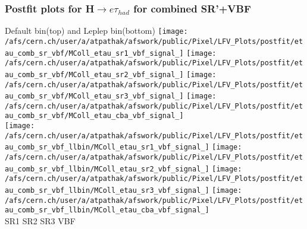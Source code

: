 \documentclass{beamer}
\begin{document}
\begin{frame}
\frametitle{Postfit plots for H$\rightarrow e\tau_{had}$ for combined SR'+VBF}
\begin{normalsize}
Default bin(top) and Leplep bin(bottom)
\vspace*{0.5cm}
\texttt{[image: /afs/cern.ch/user/a/atpathak/afswork/public/Pixel/LFV\_Plots/postfit/etau\_comb\_sr\_vbf/MColl\_etau\_sr1\_vbf\_signal\_]}
\texttt{[image: /afs/cern.ch/user/a/atpathak/afswork/public/Pixel/LFV\_Plots/postfit/etau\_comb\_sr\_vbf/MColl\_etau\_sr2\_vbf\_signal\_]}
\texttt{[image: /afs/cern.ch/user/a/atpathak/afswork/public/Pixel/LFV\_Plots/postfit/etau\_comb\_sr\_vbf/MColl\_etau\_sr3\_vbf\_signal\_]}
\texttt{[image: /afs/cern.ch/user/a/atpathak/afswork/public/Pixel/LFV\_Plots/postfit/etau\_comb\_sr\_vbf/MColl\_etau\_cba\_vbf\_signal\_]}\\

\texttt{[image: /afs/cern.ch/user/a/atpathak/afswork/public/Pixel/LFV\_Plots/postfit/etau\_comb\_sr\_vbf\_llbin/MColl\_etau\_sr1\_vbf\_signal\_]}
\texttt{[image: /afs/cern.ch/user/a/atpathak/afswork/public/Pixel/LFV\_Plots/postfit/etau\_comb\_sr\_vbf\_llbin/MColl\_etau\_sr2\_vbf\_signal\_]}
\texttt{[image: /afs/cern.ch/user/a/atpathak/afswork/public/Pixel/LFV\_Plots/postfit/etau\_comb\_sr\_vbf\_llbin/MColl\_etau\_sr3\_vbf\_signal\_]}
\texttt{[image: /afs/cern.ch/user/a/atpathak/afswork/public/Pixel/LFV\_Plots/postfit/etau\_comb\_sr\_vbf\_llbin/MColl\_etau\_cba\_vbf\_signal\_]}\\
\hspace{0.5in}SR1 
\hspace{0.75in}SR2
\hspace{0.75in}SR3
\hspace{0.75in}VBF
\end{normalsize}
\end{frame}
\end{document}
